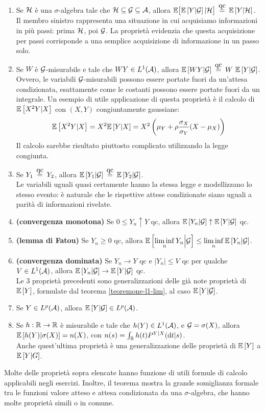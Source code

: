 \begin{teo}
\begin{enumerate}
    \item Se $\mathcal H$ è una $\sigma$-algebra tale che $\mathcal H \subseteq \mathcal G \subseteq \mathcal A$, allora
    $\EE \big[ \Ex{Y|\Gc} | \Hc \big] \aceq \Ex{Y|\Hc}$. \\
    Il membro sinistro rappresenta una situazione in cui acquisiamo informazioni in più passi: prima $\mathcal H$, poi $\mathcal G$. La proprietà evidenzia che questa acquisizione per passi corrisponde a una semplice acquisizione di informazione in un passo solo.
    \item Se $W$ è $\mathcal G$-misurabile e tale che $WY \in L^1(\mathcal A)$, allora $\Ex{WY | \Gc} \aceq W \ \Ex{Y | \Gc}$. \\
    Ovvero, le variabili $\mathcal G$-misurabili possono essere portate fuori da un'attesa condizionata, esattamente come le costanti possono essere portate fuori da un integrale. Un esempio di utile applicazione di questa proprietà è il calcolo di $\mathbb E \left[ X^2 Y | X \right]$ con $(X,Y)$ congiuntamente gaussiane:
    $$\mathbb E \left[ X^2 Y | X \right] = X^2 \mathbb E \left[ Y | X \right] = X^2 \left(\mu_Y + \rho \frac{\sigma_X}{\sigma_Y}(X-\mu_X) \right)$$
    Il calcolo sarebbe risultato piuttosto complicato utilizzando la legge congiunta.
    \item Se $Y_1 \aceq Y_2$, allora $\Ex{Y_1 | \Gc} \aceq \Ex{Y_2 | \Gc}$. \\
    Le variabili uguali quasi certamente hanno la stessa legge e modellizzano lo stesso evento: è naturale che le rispettive attese condizionate siano uguali a parità di informazioni rivelate.
    \item \textbf{(convergenza monotona)} Se $0 \leq Y_n \uparrow Y$ qc, allora $\mathbb E \left[ Y_n | \mathcal G \right] \uparrow \mathbb E \left[ Y | \mathcal G \right]$ qc.
    \item \textbf{(lemma di Fatou)} Se $Y_n \geq 0$ qc, allora
    $\mathbb E \left[ \liminf\limits_n Y_n \Big| \mathcal G \right] \leq \liminf\limits_n \mathbb E \left[ Y_n | \mathcal G \right]$.
    \item \textbf{(convergenza dominata)} Se $Y_n \to Y$ qc e $|Y_n| \leq V$ qc per qualche $V \in L^1(\mathcal A)$, allora $\mathbb E \left[ Y_n | \mathcal G \right] \to \mathbb E \left[ Y | \mathcal G \right]$ qc. \\
    Le 3 proprietà precedenti sono generalizzazioni delle già note proprietà di $\mathbb E \left[ Y \right]$, formulate dal teorema \ref{teoremone-l1-lim}, al caso $\mathbb E \left[ Y|\mathcal G \right]$.
    \item Se $Y \in L^p(\mathcal A)$, allora $\mathbb E \left[ Y | \mathcal G \right] \in L^p(\mathcal A)$.
    \item Se $h: \mathbb R \to \mathbb R$ è misurabile e tale che $h(Y) \in L^1(\mathcal A)$, e $\mathcal G = \sigma(X)$, allora
    $\mathbb E \left[ h(Y) | \sigma(X) \right] = n(X)$, con $n(s) = \int_\mathbb R h(t) P^{Y|X}(\mathrm d t|s)$. \\
    Anche quest'ultima proprietà è una generalizzazione delle proprietà di $\mathbb E \left[ Y \right]$ a $\mathbb E \left[ Y|G \right]$.
  \end{enumerate}
\end{teo}
Molte delle proprietà sopra elencate hanno funzione di utili formule di calcolo applicabili negli esercizi.
Inoltre, il teorema mostra la grande somiglianza formale tra le funzioni valore atteso e attesa condizionata da una $\sigma$-algebra, che hanno molte proprietà simili o in comune. \\

